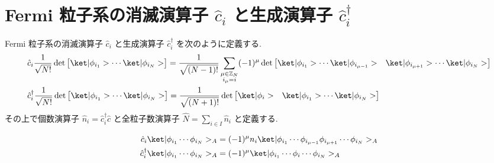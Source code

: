 \documentclass[uplatex,dvipdfmx,a4paper,11pt]{jlreq}
\DeclareMathOperator{\Det}{det}
\newcommand{\ZZ}{\mathbb{Z}}
\numberwithin{equation}{section}
\theoremstyle{definition}
\begin{document}
\section{Fermi 粒子系の消滅演算子 $\hat{c}_i$ と生成演算子 $\hat{c}_i^\dagger$}
\begin{definition}
  Fermi 粒子系の消滅演算子 $\hat{c}_i$ と生成演算子 $\hat{c}_i^\dagger$ を次のように定義する.
  \begin{align}
     & \hat{c}_i\frac{1}{\sqrt{N!}}\Det\begin{bmatrix}\ket|\phi_{i_1}> \cdots \ket|\phi_{i_N}>\end{bmatrix} = \frac{1}{\sqrt{(N-1)!}}\sum_{\substack{\mu\in\ZZ_N                                                                     \\ i_\mu = i}}(-1)^\mu\Det\begin{bmatrix}\ket|\phi_{i_1}> \cdots \ket|\phi_{i_{\mu-1}}> & \ket|\phi_{i_{\mu+1}}>\cdots\ket|\phi_{i_N}>\end{bmatrix} \\
     & \hat{c}_i^\dagger\frac{1}{\sqrt{N!}}\Det\begin{bmatrix}\ket|\phi_{i_1}> \cdots \ket|\phi_{i_N}>\end{bmatrix} = \frac{1}{\sqrt{(N+1)!}}\Det\begin{bmatrix}\ket|\phi_i> & \ket|\phi_{i_1}> \cdots \ket|\phi_{i_N}>\end{bmatrix}
  \end{align}
  その上で個数演算子 $\hat{n}_i = \hat{c}_i^\dagger\hat{c}$ と全粒子数演算子 $\hat{N} = \sum_{i\in I}\hat{n}_i$ と定義する.
\end{definition}
\begin{theorem}[Q21-50]
  \begin{align}
    \hat{c}_i\ket|\phi_{i_1}\cdots\phi_{i_N}>_A         & = (-1)^\mu n_i\ket|\phi_{i_1}\cdots\phi_{i_{\mu-1}}\phi_{i_{\mu+1}}\cdots\phi_{i_N}>_A \\
    \hat{c}_i^\dagger\ket|\phi_{i_1}\cdots\phi_{i_N}>_A & = (-1)^\mu\ket|\phi_{i_1}\cdots\phi_i\cdots\phi_{i_N}>_A
  \end{align}
\end{theorem}
\end{document}
